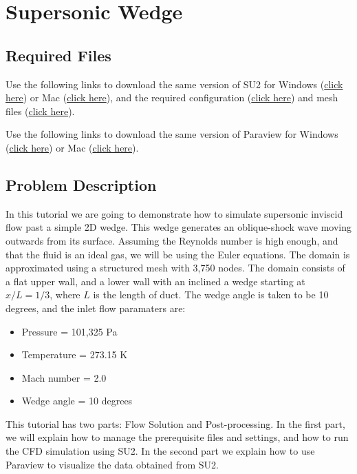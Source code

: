 \chapter{Supersonic Wedge}
\label{ch:Supersonic Wedge}
\section{Required Files}
\begin{su2note}
	Use the following links to download the same version of SU2 for Windows (\href{}{click here}) or Mac (\href{}{click here}), and the required configuration (\href{}{click here}) and mesh files (\href{}{click here}).
\end{su2note}
\begin{paraviewnote}
	Use the following links to download the same version of Paraview for Windows (\href{}{click here}) or Mac (\href{}{click here}).
\end{paraviewnote}
\section{Problem Description}
In this tutorial we are going to demonstrate how to simulate supersonic inviscid flow past a simple 2D wedge. This wedge generates an oblique-shock wave moving outwards from its surface. Assuming the Reynolds number is high enough, and that the fluid is an ideal gas, we will be using the Euler equations. The domain is approximated using a structured mesh with 3,750 nodes. The domain consists of a flat upper wall, and a lower wall with an inclined a wedge starting at $x/L=1/3$, where $L$ is the length of duct. The wedge angle is taken to be 10 degrees, and the inlet flow paramaters are:
\begin{itemize}
    \item Pressure = 101,325 Pa
    \item Temperature = 273.15 K
    \item Mach number = 2.0
    \item Wedge angle = 10 degrees
\end{itemize}
This tutorial has two parts: Flow Solution and Post-processing. In the first part, we will explain how to manage the prerequisite files and settings, and how to run the CFD simulation using SU2. In the second part we explain how to use Paraview to visualize the data obtained from SU2.
